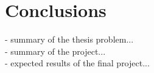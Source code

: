 \chapter{Conclusions}\label{chap:conclusions}

- summary of the thesis problem...\\
- summary of the project...\\
- expected results of the final project...\\
